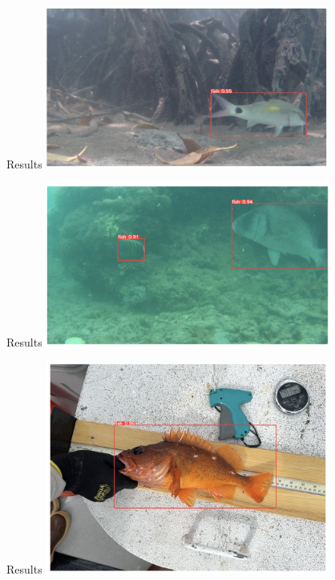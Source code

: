 \begin{frame}{Results}
    \centering
        \includegraphics[height=0.7\textheight,width=0.7\textwidth,keepaspectratio]{images/3.png}
    

 \end{frame}

 \begin{frame}{Results}
    \centering
        \includegraphics[height=0.7\textheight,width=0.7\textwidth,keepaspectratio]{images/4.png}
    

 \end{frame}

 \begin{frame}{Results}
    \centering
        \includegraphics[height=0.7\textheight,width=0.7\textwidth,keepaspectratio]{images/5.png}
    

 \end{frame}

